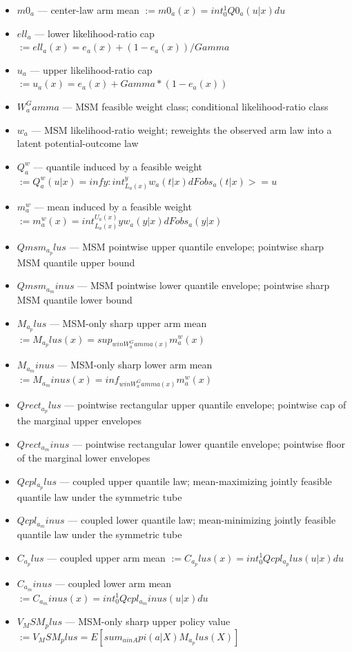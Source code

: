 \documentclass{article}
\begin{document}
\begin{itemize}
  \item $m0_a$ --- center-law arm mean $:= m0_a(x) = int_0^1 Q0_a(u|x) du$
  \item $ell_a$ --- lower likelihood-ratio cap $:= ell_a(x) = e_a(x) + (1 - e_a(x)) / Gamma$
  \item $u_a$ --- upper likelihood-ratio cap $:= u_a(x) = e_a(x) + Gamma * (1 - e_a(x))$
  \item $W_a^Gamma$ --- MSM feasible weight class; conditional likelihood-ratio class
  \item $w_a$ --- MSM likelihood-ratio weight; reweights the observed arm law into a latent potential-outcome law
  \item $Q_a^w$ --- quantile induced by a feasible weight $:= Q_a^w(u|x) = inf{y : int_{L_a(x)}^y w_a(t|x) dFobs_a(t|x) >= u}$
  \item $m_a^w$ --- mean induced by a feasible weight $:= m_a^w(x) = int_{L_a(x)}^{U_a(x)} y w_a(y|x) dFobs_a(y|x)$
  \item $Qmsm_a_plus$ --- MSM pointwise upper quantile envelope; pointwise sharp MSM quantile upper bound
  \item $Qmsm_a_minus$ --- MSM pointwise lower quantile envelope; pointwise sharp MSM quantile lower bound
  \item $M_a_plus$ --- MSM-only sharp upper arm mean $:= M_a_plus(x) = sup_{w in W_a^Gamma(x)} m_a^w(x)$
  \item $M_a_minus$ --- MSM-only sharp lower arm mean $:= M_a_minus(x) = inf_{w in W_a^Gamma(x)} m_a^w(x)$
  \item $Qrect_a_plus$ --- pointwise rectangular upper quantile envelope; pointwise cap of the marginal upper envelopes
  \item $Qrect_a_minus$ --- pointwise rectangular lower quantile envelope; pointwise floor of the marginal lower envelopes
  \item $Qcpl_a_plus$ --- coupled upper quantile law; mean-maximizing jointly feasible quantile law under the symmetric tube
  \item $Qcpl_a_minus$ --- coupled lower quantile law; mean-minimizing jointly feasible quantile law under the symmetric tube
  \item $C_a_plus$ --- coupled upper arm mean $:= C_a_plus(x) = int_0^1 Qcpl_a_plus(u|x) du$
  \item $C_a_minus$ --- coupled lower arm mean $:= C_a_minus(x) = int_0^1 Qcpl_a_minus(u|x) du$
  \item $V_MSM_plus$ --- MSM-only sharp upper policy value $:= V_MSM_plus = E[sum_{a in A} pi(a|X) M_a_plus(X)]$

\end{itemize}
\end{document}

